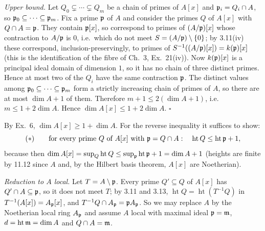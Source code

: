 \documentclass[11pt]{article}
\begin{document}
\emph{Upper bound.} Let $Q_0\subsetneq\cdots\subsetneq Q_m$ be a chain of primes of $A[x]$ and $\mathfrak p_i=Q_i\cap A$, so $\mathfrak p_0\subseteq\cdots\subseteq\mathfrak p_m$. Fix a prime $\mathfrak p$ of $A$ and consider the primes $Q$ of $A[x]$ with $Q\cap A=\mathfrak p$. They contain $\mathfrak p[x]$, so correspond to primes of $(A/\mathfrak p)[x]$ whose contraction to $A/\mathfrak p$ is $0$, i.e.\ which do not meet $S=(A/\mathfrak p)\setminus\{0\}$; by 3.11(iv) these correspond, inclusion-preservingly, to primes of $S^{-1}((A/\mathfrak p)[x])=k(\mathfrak p)[x]$ (this is the identification of the fibre of Ch.~3, Ex.~21(iv)). Now $k(\mathfrak p)[x]$ is a principal ideal domain of dimension $1$, so it has no chain of three distinct primes. Hence at most two of the $Q_i$ have the same contraction $\mathfrak p$. The distinct values among $\mathfrak p_0\subseteq\cdots\subseteq\mathfrak p_m$ form a strictly increasing chain of primes of $A$, so there are at most $\dim A+1$ of them. Therefore $m+1\le2(\dim A+1)$, i.e.\ $m\le1+2\dim A$. Hence $\dim A[x]\le1+2\dim A$. \hfill$\square$

\pf
By Ex.~6, $\dim A[x]\ge1+\dim A$. For the reverse inequality it suffices to show:
\[
(\ast)\qquad\text{for every prime }Q\text{ of }A[x]\text{ with }\mathfrak p=Q\cap A:\quad\operatorname{ht}Q\le\operatorname{ht}\mathfrak p+1 ,
\]
because then $\dim A[x]=\sup_Q\operatorname{ht}Q\le\sup_\mathfrak p\operatorname{ht}\mathfrak p+1=\dim A+1$ (heights are finite by 11.12 since $A$ and, by the Hilbert basis theorem, $A[x]$ are Noetherian).

\emph{Reduction to $A$ local.} Let $T=A\setminus\mathfrak p$. Every prime $Q'\subseteq Q$ of $A[x]$ has $Q'\cap A\subseteq\mathfrak p$, so it does not meet $T$; by 3.11 and 3.13, $\operatorname{ht}Q=\operatorname{ht}(T^{-1}Q)$ in $T^{-1}(A[x])=A_\mathfrak p[x]$, and $T^{-1}Q\cap A_\mathfrak p=\mathfrak p A_\mathfrak p$. So we may replace $A$ by the Noetherian local ring $A_\mathfrak p$ and assume $A$ local with maximal ideal $\mathfrak p=\mathfrak m$, $d=\operatorname{ht}\mathfrak m=\dim A$ and $Q\cap A=\mathfrak m$.
\end{document}
